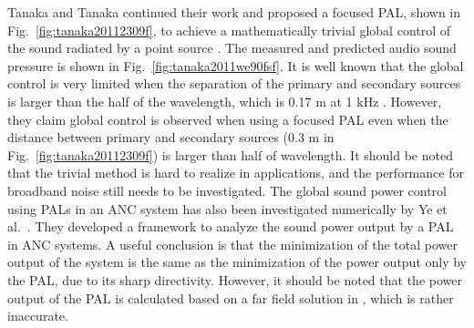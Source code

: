 Tanaka and Tanaka continued their work and proposed a focused PAL, shown in Fig.~\ref{fig:tanaka20112309f}, to achieve a mathematically trivial global control of the sound radiated by a point source \cite{Tanaka2011MathematicallyTrivialControl}. 
The {measured and predicted} audio sound pressure is shown in Fig.~\ref{fig:tanaka2011we90fsf}. 
It is well known that the global control is very limited when the separation of the primary and secondary sources is larger than the half of the wavelength, which is 0.17 m at 1 kHz \cite{Nelson1992ActiveControlSound}.
However, they claim global control is observed when using a focused PAL even {when} the distance between primary and secondary sources (0.3 m in Fig.~\ref{fig:tanaka20112309f}) is larger than {half of wavelength}.
It should be noted that the trivial method is hard to realize in applications, and the performance for broadband noise still needs to be investigated.
The global sound power control using PALs in an ANC system has also been investigated numerically by Ye et al.\ \cite{Ye2012ActivelyCreatedQuiet}. 
They developed a framework to analyze the sound power output by a PAL in ANC systems.
A useful conclusion is that {the} minimization of the total power output of the system is the same as the minimization of the power output only by the PAL, due to its sharp directivity.
However, it should be noted that the power output of the PAL is calculated based on a far field solution in \cite{Ye2012ActivelyCreatedQuiet}, which is rather inaccurate.

